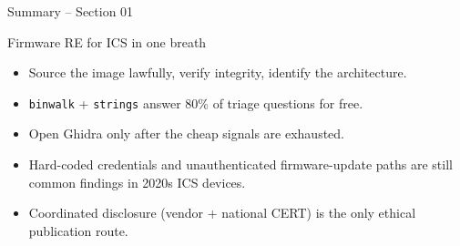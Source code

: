 \documentclass[aspectratio=169,11pt]{beamer}
\def\sectionNumber{01}
\begin{document}
\begin{frame}{Summary -- Section \sectionNumber}
\begin{takeawaybox}{Firmware RE for ICS in one breath}
\begin{itemize}\setlength{\itemsep}{2pt}
  \item Source the image lawfully, verify integrity, identify the architecture.
  \item \texttt{binwalk} + \texttt{strings} answer 80\% of triage questions for free.
  \item Open Ghidra only after the cheap signals are exhausted.
  \item Hard-coded credentials and unauthenticated firmware-update paths are still common findings in 2020s ICS devices.
  \item Coordinated disclosure (vendor + national CERT) is the only ethical publication route.
\end{itemize}
\end{takeawaybox}
\end{frame}
\end{document}
